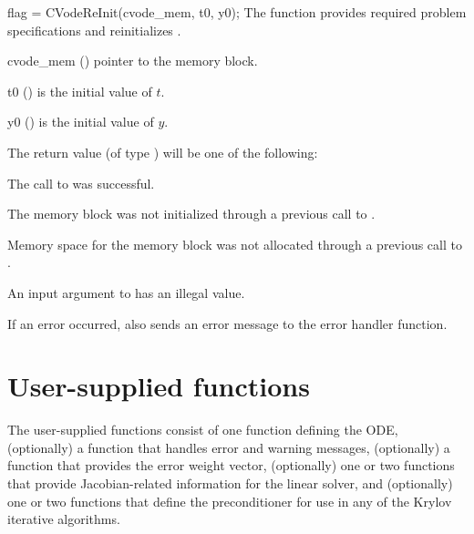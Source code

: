 {
  flag = CVodeReInit(cvode\_mem, t0, y0);
}
{
  The function  provides required problem specifications
  and reinitializes {\cvode}.
}
{
  \begin{args}
  \item[cvode\_mem] ()
    pointer to the {\cvode} memory block.
  \item[t0] ()
    is the initial value of $t$.
  \item[y0] ()
    is the initial value of $y$.
  \end{args}
}
{
  The return value  (of type ) will be one of the following:
  \begin{args}[CV\_NO\_MALLOC]
  \item[\Id{CV\_SUCCESS}]
    The call to  was successful.
  \item[\Id{CV\_MEM\_NULL}]
    The {\cvode} memory block was not initialized through a
    previous call to .
  \item[\Id{CV\_NO\_MALLOC}]
    Memory space for the {\cvode} memory block was not allocated through a
    previous call to .
  \item[\Id{CV\_ILL\_INPUT}]
    An input argument to  has an illegal value.
  \end{args}
}
{
  If an error occurred,  also sends an error message to the
  error handler function.
}


\section{User-supplied functions}\label{ss:user_fct_sim}

The user-supplied functions consist of one function defining the ODE,
(optionally) a function that handles error and warning messages,
(optionally) a function that provides the error weight vector,
(optionally) one or two functions that provide Jacobian-related
information for the linear solver, and
(optionally) one or two functions that define the preconditioner for
use in any of the Krylov iterative algorithms.

